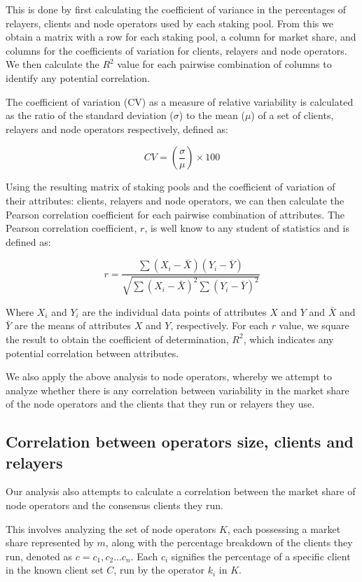 \documentclass[conference]{IEEEtran}
\begin{document}
This is done by first calculating the coefficient of variance in the percentages of relayers, clients and node operators used by each staking pool. From this we obtain a matrix with a row for each staking pool, a column for market share, and columns for the coefficients of variation for clients, relayers and node operators.  We then calculate the $R^2$ value for each pairwise combination of columns to identify any potential correlation.

The coefficient of variation (CV) as a measure of relative variability is calculated as the ratio of the standard deviation ($\sigma$) to the mean ($\mu$) of a set of clients, relayers and node operators respectively, defined as:

\[ CV = \left( \frac{\sigma}{\mu} \right) \times 100 \]

Using the resulting matrix of staking pools and the coefficient of variation of their attributes: clients, relayers and node operators, we can then calculate the Pearson correlation coefficient \cite{pearson1895} for each pairwise combination of attributes.  The Pearson correlation coefficient, $r$, is well know to any student of statistics and is defined as:

\[
r = \frac{\sum{(X_i - \bar{X})(Y_i - \bar{Y})}}{\sqrt{\sum{(X_i - \bar{X})^2}\sum{(Y_i - \bar{Y})^2}}}
\]

\vspace{3pt}

Where $X_i$ and $Y_i$ are the individual data points of attributes $X$ and $Y$ and $\bar{X}$ and $\bar{Y}$ are the means of attributes $X$ and $Y$, respectively.  For each $r$ value, we square the result to obtain the coefficient of determination, $R^2$, which indicates any potential correlation between attributes.

We also apply the above analysis to node operators, whereby we attempt to analyze whether there is any correlation between variability in the market share of the node operators and the clients that they run or relayers they use.

\subsection{Correlation between operators size, clients and relayers}

Our analysis also attempts to calculate a correlation between the market share of node operators and the consensus clients they run.

This  involves analyzing the set of node operators $K$, each possessing a market share represented by $m$, along with the percentage breakdown of the clients they run, denoted as $c = { c_1, c_2 . . . c_n }$. Each $c_i$ signifies the percentage of a specific client in the known client set $C$, run by the operator $k_i$ in $K$.
\end{document}
